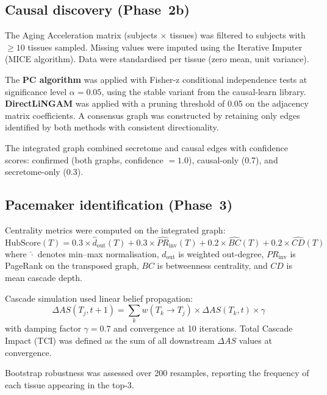 \documentclass[11pt,a4paper]{article}
\begin{document}
\subsection*{Causal discovery (Phase~2b)}

The Aging Acceleration matrix (subjects $\times$ tissues) was filtered to subjects with $\geq 10$ tissues sampled. Missing values were imputed using the Iterative Imputer (MICE algorithm). Data were standardised per tissue (zero mean, unit variance).

The \textbf{PC algorithm} was applied with Fisher-z conditional independence tests at significance level $\alpha = 0.05$, using the stable variant from the causal-learn library. \textbf{DirectLiNGAM} was applied with a pruning threshold of 0.05 on the adjacency matrix coefficients. A consensus graph was constructed by retaining only edges identified by both methods with consistent directionality.

The integrated graph combined secretome and causal edges with confidence scores: confirmed (both graphs, confidence $= 1.0$), causal-only (0.7), and secretome-only (0.3).

\subsection*{Pacemaker identification (Phase~3)}

Centrality metrics were computed on the integrated graph:
\begin{equation}
\text{HubScore}(T) = 0.3 \times \hat{d}_{\text{out}}(T) + 0.3 \times \widehat{PR}_{\text{inv}}(T) + 0.2 \times \widehat{BC}(T) + 0.2 \times \widehat{CD}(T)
\label{eq:hubscore}
\end{equation}
where $\hat{\cdot}$ denotes min--max normalisation, $d_{\text{out}}$ is weighted out-degree, $PR_{\text{inv}}$ is PageRank on the transposed graph, $BC$ is betweenness centrality, and $CD$ is mean cascade depth.

Cascade simulation used linear belief propagation:
\begin{equation}
\Delta AS(T_j, t+1) = \sum_k w(T_k \to T_j) \times \Delta AS(T_k, t) \times \gamma
\label{eq:cascade}
\end{equation}
with damping factor $\gamma = 0.7$ and convergence at 10 iterations. Total Cascade Impact (TCI) was defined as the sum of all downstream $\Delta AS$ values at convergence.

Bootstrap robustness was assessed over 200 resamples, reporting the frequency of each tissue appearing in the top-3.
\end{document}
